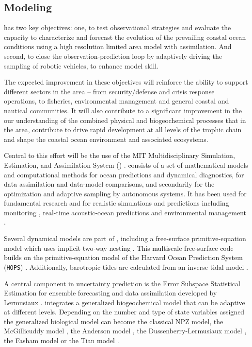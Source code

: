 
\subsection{Modeling}

\proj has two key objectives: one, to test observational strategies
and evaluate the capacity to characterize and forecast the evolution
of the prevailing coastal ocean conditions using a high resolution
limited area model with assimilation. And second, to close the
observation-prediction loop by adaptively driving the sampling of
robotic vehicles, to enhance model skill.

The expected improvement in these objectives will reinforce the
ability to support different sectors in the area -- from
security/defense and crisis response operations, to fisheries,
environmental management and general coastal and nautical
communities. It will also contribute to a significant improvement in
the our understanding of the combined physical and biogeochemical
processes that in the \naz area, contribute to drive rapid
development at all levels of the trophic chain and shape the coastal
ocean environment and associated ecosystems.

Central to this effort will be the use of the MIT Multidisciplinary
Simulation, Estimation, and Assimilation System (\msee)
\cite{haley10,mseas10}. \mse consists of a set of mathematical models
and computational methods for ocean predictions and dynamical
diagnostics, for data assimilation and data-model comparisons, and
secondarily for the optimization and adaptive sampling by autonomous
systems. It has been used for fundamental research and for realistic
simulations and predictions including monitoring \cite{lermusiaux07},
real-time acoustic-ocean predictions \cite{xu08,lermusiaux10} and
environmental management \cite{cossarini09}.

Several dynamical models are part of \msee, including a free-surface
primitive-equation model which uses implicit two-way nesting
\cite{haley10}. This multiscale free-surface code builds on the
primitive-equation model of the Harvard Ocean Prediction System
(\texttt{HOPS}) \cite{robinson96,haley99}.  Additionally, barotropic
tides are calculated from an inverse tidal model
\cite{logutov08a,logutov08b}.

A central component in \mse uncertainty prediction is the Error
Subspace Statistical Estimation for ensemble forecasting and data
assimilation developed by Lermusiaux
\cite{lermusiaux06,lermusiaux07}. \mse integrates a generalized
biogeochemical model that can be adaptive at different
levels. Depending on the number and type of state variables assigned
the generalized biological model can become the classical NPZ model,
the McGillicuddy model \cite{mcgillicuddy95}, the Anderson model
\cite{anderson00}, the Dussenberry-Lermusiaux model
\cite{becsiktepe03}, the Fasham model \cite{fasham90} or the Tian
model \cite{tian00,tian01}.

